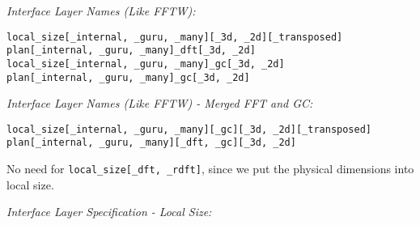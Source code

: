 \emph{Interface Layer Names (Like FFTW):}
\begin{lstlisting}
local_size[_internal, _guru, _many][_3d, _2d][_transposed]
plan[_internal, _guru, _many]_dft[_3d, _2d]
local_size[_internal, _guru, _many]_gc[_3d, _2d]
plan[_internal, _guru, _many]_gc[_3d, _2d]
\end{lstlisting}

\emph{Interface Layer Names (Like FFTW) - Merged FFT and GC:}
\begin{lstlisting}
local_size[_internal, _guru, _many][_gc][_3d, _2d][_transposed]
plan[_internal, _guru, _many][_dft, _gc][_3d, _2d]
\end{lstlisting}
No need for \lstinline{local_size[_dft, _rdft]}, since we put the physical dimensions into local size.


\newpage
\emph{Interface Layer Specification - Local Size:}
